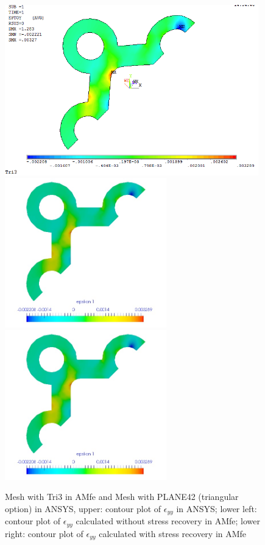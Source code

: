\begin{figure}[htbp]
	\begin{center}
		\includegraphics[width=11cm,clip]{TTri3_Eyy.png} 	
		\includegraphics[width=7cm,clip]{TTri3_Eyy_PD.png} 	
		\includegraphics[width=7cm,clip]{TTri3_Eyy_P.png} 		
		\caption{Mesh with Tri3 in AMfe and Mesh with PLANE42 (triangular option) in ANSYS, upper: contour plot of $\epsilon_{yy}$ in ANSYS; lower left: contour plot of $\epsilon_{yy}$ calculated without stress recovery in AMfe; lower right: contour plot of $\epsilon_{yy}$ calculated with stress recovery in AMfe} \label{fig: Tri3_Eyy}
	\end{center}
\end{figure}
\clearpage 

